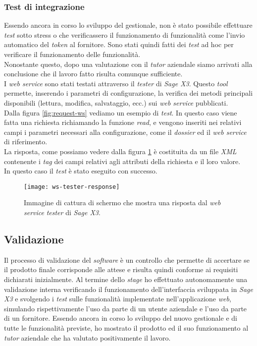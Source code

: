 \subsubsection{Test di integrazione}
Essendo ancora in corso lo sviluppo del gestionale, non è stato possibile effettuare \textit{test} sotto stress o che verificassero il funzionamento di funzionalità come l'invio automatico del \textit{token} al fornitore. Sono stati quindi fatti dei \textit{test} ad hoc per verificare il funzionamento delle funzionalità.\\
Nonostante questo, dopo una valutazione con il \textit{tutor} aziendale siamo arrivati alla conclusione che il lavoro fatto risulta comunque sufficiente.\\
I \textit{web service} sono stati testati attraverso il \textit{tester} di \textit{Sage X3}. Questo \textit{tool} permette, inserendo i parametri di configurazione, la verifica dei metodi principali disponibili (lettura, modifica, salvataggio, ecc.) sui \textit{web service} pubblicati.\\
Dalla figura \ref{fig:request-ws} vediamo un esempio di \textit{test}. In questo caso viene fatta una richiesta richiamando la funzione \textit{read}, e vengono inseriti nei relativi campi i parametri necessari alla configurazione, come il \textit{dossier} ed il \textit{web service} di riferimento.\\
La risposta, come possiamo vedere dalla figura \ref{fig:response-ws} è costituita da un file \textit{XML} contenente i \textit{tag} dei campi relativi agli attributi della richiesta e il loro valore.\\
In questo caso il \textit{test} è stato eseguito con successo.


\begin{figure}[htbp]
	\begin{center}
		\texttt{[image: ws-tester-response]}
		\caption{Immagine di cattura di schermo che mostra una risposta dal \textit{web service} \textit{tester} di \textit{Sage X3}.}
		\label{fig:response-ws}
	\end{center}
\end{figure}

\newpage
\subsection{Validazione}
Il processo di validazione del \textit{software} è un controllo che permette di accertare se il prodotto finale corrisponde alle attese e risulta quindi conforme ai requisiti dichiarati inizialmente.
Al termine dello \textit{stage} ho effettuato autonomamente una validazione interna verificando il funzionamento dell'interfaccia sviluppata in \textit{Sage X3} e svolgendo i \textit{test} sulle funzionalità implementate nell'applicazione \textit{web}, simulando rispettivamente l'uso da parte di un utente aziendale e l'uso da parte di un fornitore.
Essendo ancora in corso lo sviluppo del nuovo gestionale e di tutte le funzionalità previste, ho mostrato il prodotto ed il suo funzionamento al \textit{tutor} aziendale che ha valutato positivamente il lavoro.

